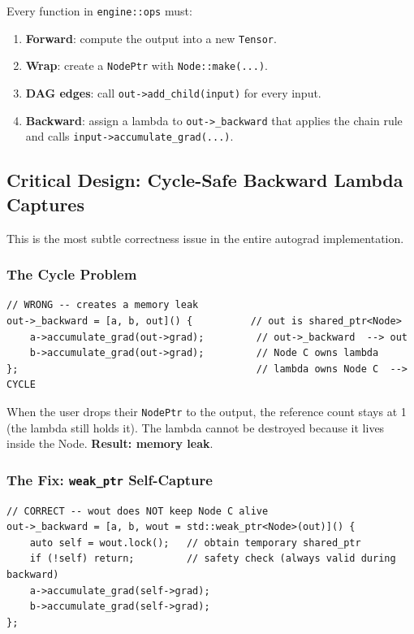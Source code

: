 \documentclass[12pt, a4paper]{article}
\begin{document}
Every function in \texttt{engine::ops} must:

\begin{enumerate}
  \item \textbf{Forward}: compute the output into a new \texttt{Tensor}.
  \item \textbf{Wrap}: create a \texttt{NodePtr} with \texttt{Node::make(...)}.
  \item \textbf{DAG edges}: call \texttt{out->add\_child(input)} for every input.
  \item \textbf{Backward}: assign a lambda to \texttt{out->\_backward} that
        applies the chain rule and calls \texttt{input->accumulate\_grad(...)}.
\end{enumerate}

\subsection{Critical Design: Cycle-Safe Backward Lambda Captures}

This is the most subtle correctness issue in the entire autograd implementation.

\subsubsection{The Cycle Problem}

\begin{lstlisting}[caption={Naive capture creates a self-reference cycle},
  numbers=none]
// WRONG -- creates a memory leak
out->_backward = [a, b, out]() {          // out is shared_ptr<Node>
    a->accumulate_grad(out->grad);         // out->_backward  --> out
    b->accumulate_grad(out->grad);         // Node C owns lambda
};                                         // lambda owns Node C  --> CYCLE
\end{lstlisting}

When the user drops their \texttt{NodePtr} to the output, the reference
count stays at 1 (the lambda still holds it).  The lambda cannot be destroyed
because it lives inside the Node.  \textbf{Result: memory leak}.

\subsubsection{The Fix: \texttt{weak\_ptr} Self-Capture}

\begin{lstlisting}[caption={Correct cycle-safe capture pattern used in all ops}]
// CORRECT -- wout does NOT keep Node C alive
out->_backward = [a, b, wout = std::weak_ptr<Node>(out)]() {
    auto self = wout.lock();   // obtain temporary shared_ptr
    if (!self) return;         // safety check (always valid during backward)
    a->accumulate_grad(self->grad);
    b->accumulate_grad(self->grad);
};
\end{lstlisting}
\end{document}
